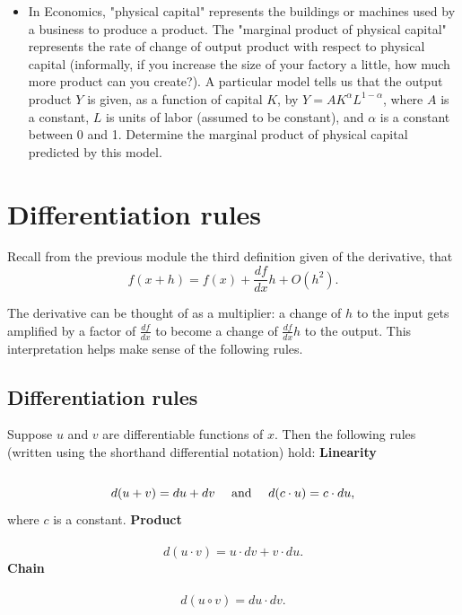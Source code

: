 \documentclass[twoside,openright,titlepage,a4paper]{book}
\begin{document}
\begin{sloppypar}
\begin{itemize}
\item In Economics, "physical capital" represents the buildings or machines used by a business to produce a product. The "marginal product of physical capital" represents the rate of change of output product with respect to physical capital (informally, if you increase the size of your factory a little, how much more product can you create?). A particular model tells us that the output product $Y$ is given, as a function of capital $K$, by $ Y = A K^{\alpha} L^{1-\alpha} $, where $A$ is a constant, $L$ is units of labor (assumed to be constant), and $\alpha$ is a constant between 0 and 1. Determine the marginal product of physical capital predicted by this model.
\end{itemize}

\section{Differentiation rules} \label{ChDifferentiationSecDifferentiationRules}
Recall from the previous module the third definition given of the derivative, that \[ f(x+h) = f(x) + \frac{df}{dx}h + O(h^2). \]

The derivative can be thought of as a multiplier: a change of $h$ to the input gets amplified by a factor of $\frac{df}{dx}$ to become a change of $\frac{df}{dx}h$ to the output. This interpretation helps make sense of the following rules.

\subsection{Differentiation rules}
Suppose $u$ and $v$ are differentiable functions of $x$. Then the following rules (written using the shorthand differential notation) hold:
\bigbreak
\noindent \textbf{Linearity}\\\\
\[ d(u+v) = du + dv \quad \hbox{ and } \quad d(c\cdot u) = c \cdot du, \] where $c$ is a constant.
\bigbreak
\noindent \textbf{Product}\\\\
\[ d(u \cdot v) = u \cdot dv + v \cdot du. \]
\bigbreak
\noindent \textbf{Chain}\\\\
\[ d(u\circ v) = du \cdot dv. \]


\end{sloppypar}
\end{document}
